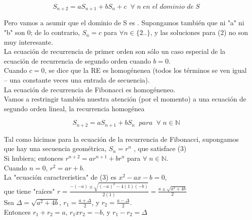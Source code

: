 \documentclass{article}
\begin{document}
\begin{equation}
  S_{n+2} = aS_{n+1} + bS_{n} + c \;\; \forall\; n \; \textit{en el dominio de} \; S
\end{equation}

Pero vamos a asumir que el dominio de S es . Supongamos también que ni "a" ni "b" son 0; de lo contrario, $S_n = c$ para $\forall n \in  \{2.. \}$, y las soluciones para (2) no son muy interesante.\\

La ecuación de recurrencia de primer orden son sólo un caso especial de la ecuación de recurrencia de  segundo orden  cuando $b = 0$.\\

Cuando $c = 0$, se dice que la RE es homogénenea (todos los términos se ven igual – una constante veces una entrada de secuencia).\\

La ecuación de recurrencia de Fibonacci es homogéneneo. \\

Vamos a restringir también nuestra atención (por el momento) a una ecuación de segundo orden lineal, la recurrencia homogénea

\begin{equation}
S_{n+2} = aS_{n+1} + bS_{n}\;\; \textit{para} \;\; \forall\; n \in \mathbb{N}
\end{equation}

Tal como hicimos para la ecuación de la recurrencia de Fibonacci, supongamos que hay una secuencia geométrica, $S_n = r^n$ , que satisface (3)\\

Si hubiera; entonces $r^{n+2} = ar^{n+1} + br^{n}$ para $\forall \; n \in \mathbb{N}$.\\

Cuando $n = 0$, \;\;\; $r^2 = ar + b$.\\

La "ecuación caractreristica" de (3) es $x^2 -ax-b=0$,\\

que tiene "raíces" $r = \frac{-(-a) \pm \sqrt{(-a)^2 - 4(1)(-b)}}{2(1)} = \frac{a \pm \sqrt{a^2 + 4b}}{2}$\\

Sea $\Delta = \sqrt{a^2 + 4b}$, $r_1 = \frac{a + \Delta}{2}$, y $r_2 = \frac{a - \Delta}{2}$.\\

Entonces $r_1 + r_2 = a$, $r_1 \textit{x} r_2 = -b$, y $r_1 - r_2 = \Delta $ \\
\end{document}
